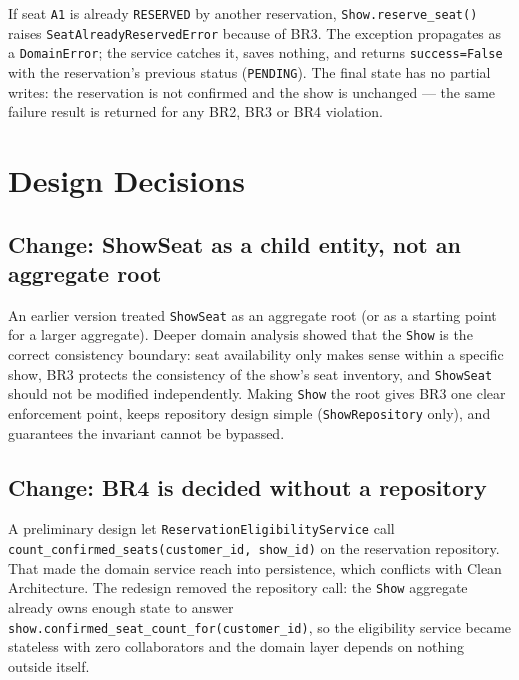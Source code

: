 \documentclass[11pt,a4paper]{article}
\newcommand{\code}[1]{\texttt{#1}}
\begin{document}
If seat \code{A1} is already \code{RESERVED} by another reservation,
\code{Show.reserve\_seat()} raises \code{SeatAlreadyReservedError} because of
BR3. The exception propagates as a \code{DomainError}; the service catches it,
saves nothing, and returns \code{success=False} with the reservation's previous
status (\code{PENDING}). The final state has no partial writes: the reservation
is not confirmed and the show is unchanged --- the same failure result is
returned for any BR2, BR3 or BR4 violation.

\section{Design Decisions}

\subsection{Change: ShowSeat as a child entity, not an aggregate root}

An earlier version treated \code{ShowSeat} as an aggregate root (or as a
starting point for a larger aggregate). Deeper domain analysis showed that the
\code{Show} is the correct consistency boundary: seat availability only makes
sense within a specific show, BR3 protects the consistency of the show's seat
inventory, and \code{ShowSeat} should not be modified independently. Making
\code{Show} the root gives BR3 one clear enforcement point, keeps repository
design simple (\code{ShowRepository} only), and guarantees the invariant cannot
be bypassed.

\subsection{Change: BR4 is decided without a repository}

A preliminary design let \code{ReservationEligibilityService} call
\code{count\_confirmed\_seats(customer\_id, show\_id)} on the reservation
repository. That made the domain service reach into persistence, which
conflicts with Clean Architecture. The redesign removed the repository call:
the \code{Show} aggregate already owns enough state to answer
\code{show.confirmed\_seat\_count\_for(customer\_id)}, so the eligibility
service became stateless with zero collaborators and the domain layer depends on
nothing outside itself.
\end{document}
